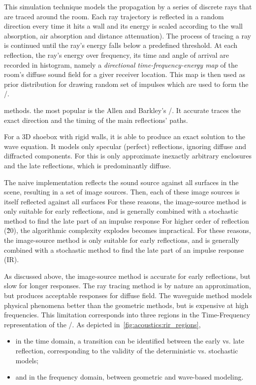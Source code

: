 This simulation technique models the propagation by a series of discrete rays that are traced around the room.
Each ray trajectory is reflected in a random direction every time it hits a wall and its energy is scaled according to the wall absorption, air absorption and distance attenuation).
The process of tracing a ray is continued until the ray’s energy falls below a predefined threshold.
At each reflection, the ray's energy over frequency, its time and angle of arrival are recorded in histogram, namely a
\textit{directional time-frequency-energy map} of the room’s diffuse sound field for a giver receiver location.
This map is then used as prior distribution for drawing random set of impulses which are used to form the \RIR/.

 methods.
the most popular is the Allen and Barkley's \ISMf/\cite{allen1979image}.
It accurate traces the exact direction and the timing of the main reflections' paths.

For a 3D shoebox with rigid walls, it is able to produce an exact solution to the wave equation.
It models only specular (perfect) reflections, ignoring diffuse and diffracted components.
For this is only approximate inexactly arbitrary enclosures and the late reflections, which is predominantly diffuse.

The naive implementation reflects the sound source against all surfaces in the scene, resulting in a set of image sources. Then, each of these image sources is itself reflected against all surfaces
For these reasons, the image-source method is only suitable for early reflections, and is generally combined with a stochastic method to find the late part of an impulse response
For higher order of reflection (\~20), the algorithmic complexity explodes becomes impractical.
For these reasons, the image-source method is only suitable for early reflections, and is generally combined with a stochastic method to find the late part of an impulse response (IR).

As discussed above, the image-source method is accurate for early reflections, but slow for longer responses.
The ray tracing method is by nature an approximation, but produces acceptable responses for diffuse field.
The waveguide method models physical phenomena better than the geometric methods, but is expensive at high frequencies.
This limitation corresponds into three regions in the Time-Frequency representation of the \RIR/.
As depicted in~\cref{fig:acoustics:rir_regions},
\begin{itemize}
    \item in the time domain, a transition can be identified between the early vs. late reflection, corresponding to the validity of the deterministic vs. stochastic models;
    \item and in the frequency domain, between geometric and wave-based modeling.
\end{itemize}

